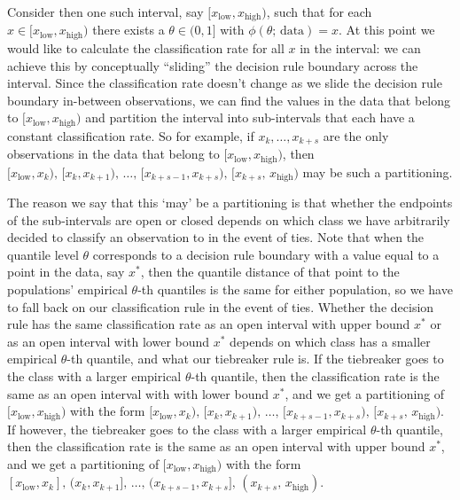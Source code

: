 \documentclass{article}
\begin{document}
Consider then one such interval, say
$[x_{\scriptscriptstyle\text{low}}, x_{\scriptscriptstyle\text{high}})$, such
that for each
$x \in [x_{\scriptscriptstyle\text{low}}, x_{\scriptscriptstyle\text{high}})$
there exists a $\theta \in (0, 1]$ with $\phi(\theta;\, \text{data}) = x$.  At
this point we would like to calculate the classification rate for all $x$ in the
interval: we can achieve this by conceptually ``sliding'' the decision rule
boundary across the interval.  Since the classification rate doesn't change as
we slide the decision rule boundary in-between observations, we can find the
values in the data that belong to
$[x_{\scriptscriptstyle\text{low}}, x_{\scriptscriptstyle\text{high}})$ and
partition the interval into sub-intervals that each have a constant
classification rate.  So for example, if $x_k, \dots, x_{k+s}$ are the only
observations in the data that belong to
$[x_{\scriptscriptstyle\text{low}}, x_{\scriptscriptstyle\text{high}})$, then
$[x_{\scriptscriptstyle\text{low}}, x_k),\, [x_k, x_{k+1}),\, \dots,\,
[x_{k+s-1}, x_{k+s}),\, [x_{k+s},\, x_{\scriptscriptstyle\text{high}})$ may be
such a partitioning.

The reason we say that this `may' be a partitioning is that whether the
endpoints of the sub-intervals are open or closed depends on which class we have
arbitrarily decided to classify an observation to in the event of ties.  Note
that when the quantile level $\theta$ corresponds to a decision rule boundary
with a value equal to a point in the data, say $x^{*}$, then the quantile
distance of that point to the populations' empirical $\theta$-th quantiles is
the same for either population, so we have to fall back on our classification
rule in the event of ties.  Whether the decision rule has the same
classification rate as an open interval with upper bound $x^{*}$ or as an open
interval with lower bound $x^{*}$ depends on which class has a smaller empirical
$\theta$-th quantile, and what our tiebreaker rule is.  If the tiebreaker goes
to the class with a larger empirical $\theta$-th quantile, then the
classification rate is the same as an open interval with with lower bound
$x^{*}$, and we get a partitioning of
$[x_{\scriptscriptstyle\text{low}}, x_{\scriptscriptstyle\text{high}})$ with the
form
$[x_{\scriptscriptstyle\text{low}}, x_k),\, [x_k, x_{k+1}),\, \dots,\,
[x_{k+s-1}, x_{k+s}),\, [x_{k+s},\, x_{\scriptscriptstyle\text{high}})$.  If
however, the tiebreaker goes to the class with a larger empirical $\theta$-th
quantile, then the classification rate is the same as an open interval with
upper bound $x^{*}$, and we get a partitioning of
$[x_{\scriptscriptstyle\text{low}}, x_{\scriptscriptstyle\text{high}})$ with the
form
$[x_{\scriptscriptstyle\text{low}}, x_k],\, (x_k, x_{k+1}],\, \dots,\,
(x_{k+s-1}, x_{k+s}],\, (x_{k+s},\, x_{\scriptscriptstyle\text{high}})$.
\end{document}
